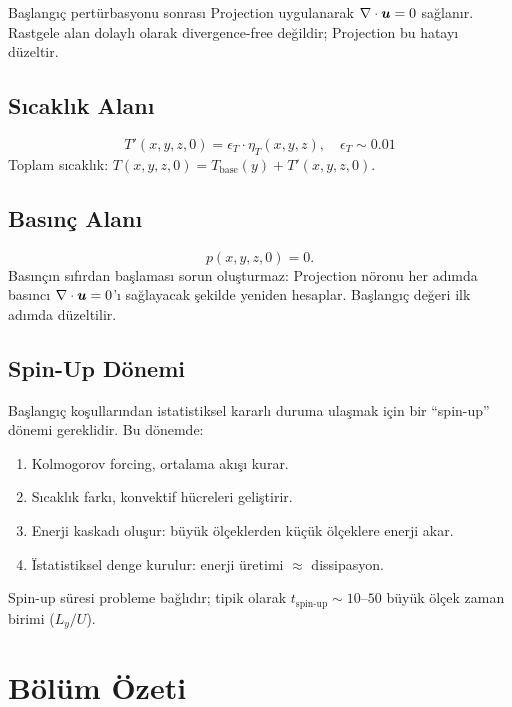 \begin{remark}
Başlangıç pertürbasyonu sonrası Projection uygulanarak $\nabla \cdot \bm{u} = 0$ sağlanır. Rastgele alan dolaylı olarak divergence-free değildir; Projection bu hatayı düzeltir.
\end{remark}

\subsection{Sıcaklık Alanı}
\begin{equation}
    T'(x, y, z, 0) = \epsilon_T \cdot \eta_T(x, y, z), \quad \epsilon_T \sim 0.01
    \label{eq:ic_temperature}
\end{equation}
Toplam sıcaklık: $T(x, y, z, 0) = T_{\text{base}}(y) + T'(x, y, z, 0)$.

\subsection{Basınç Alanı}
\begin{equation}
    p(x, y, z, 0) = 0.
    \label{eq:ic_pressure}
\end{equation}
Basınçın sıfırdan başlaması sorun oluşturmaz: Projection nöronu her adımda basıncı $\nabla \cdot \bm{u} = 0$'ı sağlayacak şekilde yeniden hesaplar. Başlangıç değeri ilk adımda düzeltilir.

\subsection{Spin-Up Dönemi}

Başlangıç koşullarından istatistiksel kararlı duruma ulaşmak için bir ``spin-up'' dönemi gereklidir. Bu dönemde:
\begin{enumerate}
    \item Kolmogorov forcing, ortalama akışı kurar.
    \item Sıcaklık farkı, konvektif hücreleri geliştirir.
    \item Enerji kaskadı oluşur: büyük ölçeklerden küçük ölçeklere enerji akar.
    \item \"{I}statistiksel denge kurulur: enerji üretimi $\approx$ dissipasyon.
\end{enumerate}
Spin-up süresi probleme bağlıdır; tipik olarak $t_{\text{spin-up}} \sim 10$--$50$ büyük ölçek zaman birimi ($L_y / U$).


\section{Bölüm Özeti}
\label{sec:problem_ozet}


